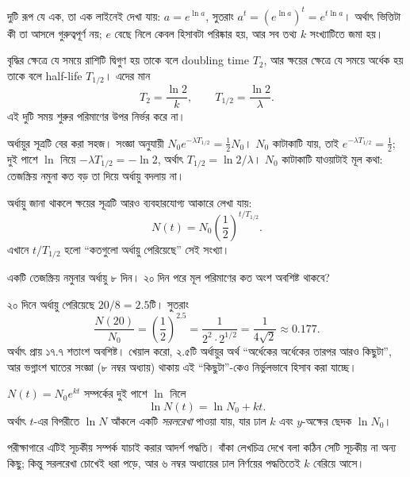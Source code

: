 \documentclass[11pt]{article}
\begin{document}
দুটি রূপ যে এক, তা এক লাইনেই দেখা যায়: $a = e^{\ln a}$, সুতরাং
$a^{t} = \left( e^{\ln a} \right)^{t} = e^{t \ln a}$। অর্থাৎ ভিত্তিটা কী তা
আসলে গুরুত্বপূর্ণ নয়; $e$ বেছে নিলে কেবল হিসাবটা পরিষ্কার হয়, আর সব তথ্য
$k$ সংখ্যাটিতে জমা হয়।

\begin{idea}[দ্বিগুণ সময় ও অর্ধায়ু]
বৃদ্ধির ক্ষেত্রে যে সময়ে রাশিটি দ্বিগুণ হয় তাকে বলে doubling time $T_{2}$, আর
ক্ষয়ের ক্ষেত্রে যে সময়ে অর্ধেক হয় তাকে বলে half-life $T_{1/2}$। এদের মান
\[
  T_{2} = \frac{\ln 2}{k} , \qquad T_{1/2} = \frac{\ln 2}{\lambda} .
\]
এই দুটি সময় শুরুর পরিমাণের উপর নির্ভর করে না।
\end{idea}

অর্ধায়ুর সূত্রটি বের করা সহজ। সংজ্ঞা অনুযায়ী
$N_{0} e^{-\lambda T_{1/2}} = \tfrac{1}{2} N_{0}$। $N_{0}$ কাটাকাটি যায়, তাই
$e^{-\lambda T_{1/2}} = \tfrac{1}{2}$; দুই পাশে $\ln$ নিয়ে
$-\lambda T_{1/2} = -\ln 2$, অর্থাৎ $T_{1/2} = \ln 2 / \lambda$। $N_{0}$
কাটাকাটি যাওয়াটাই মূল কথা: তেজস্ক্রিয় নমুনা কত বড় তা দিয়ে অর্ধায়ু বদলায় না।

অর্ধায়ু জানা থাকলে ক্ষয়ের সূত্রটি আরও ব্যবহারযোগ্য আকারে লেখা যায়:
\[
  N(t) = N_{0} \left( \frac{1}{2} \right)^{t / T_{1/2}} .
\]
এখানে $t / T_{1/2}$ হলো ``কতগুলো অর্ধায়ু পেরিয়েছে'' সেই সংখ্যা।

\begin{example}
একটি তেজস্ক্রিয় নমুনার অর্ধায়ু ৮ দিন। ২০ দিন পরে মূল পরিমাণের কত অংশ অবশিষ্ট
থাকবে?
\end{example}

\begin{solbox}
২০ দিনে অর্ধায়ু পেরিয়েছে $20/8 = 2.5$টি। সুতরাং
\[
  \frac{N(20)}{N_{0}} = \left( \frac{1}{2} \right)^{2.5}
  = \frac{1}{2^{2} \cdot 2^{1/2}} = \frac{1}{4\sqrt{2}} \approx 0.177 .
\]
অর্থাৎ প্রায় ১৭.৭ শতাংশ অবশিষ্ট। খেয়াল করো, ২.৫টি অর্ধায়ুর অর্থ ``অর্ধেকের
অর্ধেকের তারপর আরও কিছুটা'', আর ভগ্নাংশ ঘাতের সংজ্ঞা (৮ নম্বর অধ্যায়)
থাকায় এই ``কিছুটা''-কেও নির্ভুলভাবে হিসাব করা যাচ্ছে।
\end{solbox}

\begin{idea}[অর্ধ-লগারিদমীয় লেখচিত্র]
$N(t) = N_{0} e^{kt}$ সম্পর্কের দুই পাশে $\ln$ নিলে
\[
  \ln N(t) = \ln N_{0} + kt .
\]
অর্থাৎ $t$-এর বিপরীতে $\ln N$ আঁকলে একটি \emph{সরলরেখা} পাওয়া যায়, যার ঢাল
$k$ এবং $y$-অক্ষের ছেদক $\ln N_{0}$।
\end{idea}

পরীক্ষাগারে এটিই সূচকীয় সম্পর্ক যাচাই করার আদর্শ পদ্ধতি। বাঁকা লেখচিত্র দেখে
বলা কঠিন সেটি সূচকীয় না অন্য কিছু; কিন্তু সরলরেখা চোখেই ধরা পড়ে, আর ৬ নম্বর
অধ্যায়ের ঢাল নির্ণয়ের পদ্ধতিতেই $k$ বেরিয়ে আসে। 
\end{document}
